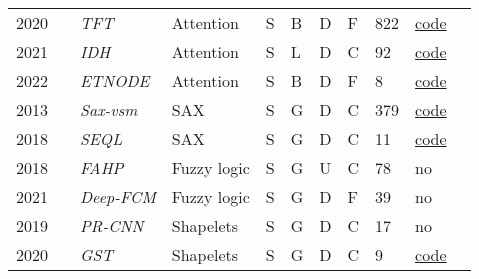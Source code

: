 \begin{table*}[p]
\begin{tabular}{@{}lllllllllll@{}}
    2020        & \cite{lim_temporal_2020}         & \textit{TFT}      & Attention     &S       & B          & D      & F                       & 822               & \href{https://github.com/greatwhiz/tft_tf2}{code}       \\ 
    
    2021        & \cite{choi_fully_2021}               &\textit{IDH}& Attention   &S       & L         & D      & C                                 & 92                & \href{https://github.com/yoonchoi-neuro/automated_hybrid_IDH}{code}\\  
  
    2022        &\cite{gao_explainable_2022}       &  \textit{ETNODE}  & Attention     &S       & B          & D      & F                        & 8                 & \href{https://github.com/PengleiGao/ETN-ODE}{code} \\  

    2013        & \cite{senin_sax-vsm_2013}             &\textit{Sax-vsm}   & SAX           & S      & G        & D      & C                    & 379               & \href{https://github.com/jMotif/sax-vsm_classic}{code}\\ 

    2018        & \cite{nguyen_interpretable_2018}&\textit{SEQL}&SAX        &S       & G        & D      & C                    & 11                & \href{https://github.com/lnthach/Mr-SEQL}{code}\\ 
    
    2018        & \cite{el-sappagh_ontology-based_2018}   & \textit{FAHP}     & Fuzzy logic    &S       & G        & U      & C                    & 78                & no\\ 

    2021        & \cite{wang_deep_2021}           & \textit{\footnotesize{Deep-FCM}}& Fuzzy logic    &S       & G        & D      & F                        & 39                & no\\ 

    2019        &  \cite{wang_learning_2019}      &\textit{PR-CNN} & Shapelets      &S       & G        & D      & C                    & 17                & no\\ 

    2020        & \cite{kidger_generalised_2020}& \textit{GST}      & Shapelets     &S       & G        & D      & C                    & 9                 & \href{https://github.com/patrick-kidger/generalised_shapelets}{code}\\  


\end{tabular}
\end{table*}
